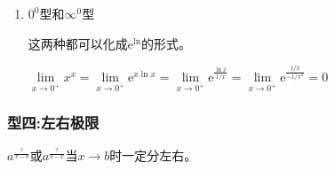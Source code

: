 \begin{enumerate}
            
    

                        
        \begin{example}
            求极限：$\lim\limits_{x \to +\infty}(2x+1)^2 \sin{\frac{1}{x^2}}$。
        \end{example}  
        
        \begin{solution}
            \begin{align*}
                \text{原式}
                &=\lim_{x \to +\infty}\frac{(2x+1)^2}{x^2} \times \frac{\sin{\frac{1}{x^2}}}{\frac{1}{x^2}}=4
            \end{align*}
        \end{solution}

        \begin{example}
            求极限：$\lim\limits_{x \to +\infty}(x-x^2\ln(1+\displaystyle\frac{1}{x}))$。
        \end{example}

        \begin{solution}
            \begin{align*}
                \text{原式}
                &=\lim_{x \to +\infty}x^2(\frac{1}{x}-\ln(1+\frac{1}{x}))\\
                &=\lim_{x \to +\infty}\frac{\frac{1}{x}-\ln(1+\frac{1}{x})}{\frac{1}{x^2}}\\
                &\xlongequal{t=\frac{1}{x}}\lim_{t \to 0}\frac{t-\ln(1+t)}{t^2}\\
                &=\lim_{t \to 0}\frac{1-\frac{1}{t+1}}{2t}\\
                &=\lim_{t \to 0}\frac{\frac{t}{t+1}}{2t}=\frac{1}{2}
            \end{align*}
        \end{solution}

        \item $0^0$型和$\infty ^{0}$型

        这两种都可以化成$\mathrm{e}^{\ln}$的形式。

        \begin{example}
            $\lim\limits_{x \to 0^{+}}x^x=\lim\limits_{x \to 0^{+}}\mathrm{e}^{x \ln x}=\lim\limits_{x \to 0^{+}}\mathrm{e}^{\frac{\ln x}{1/x}}=\lim\limits_{x \to 0^{+}}\mathrm{e}^{\frac{1/x}{-1/x^2}}=0$
        \end{example}
        \end{enumerate}

        \subsubsection*{型四:左右极限}
        \FiveStar $a^{\displaystyle\frac{?}{x-b}}$或$a^{\displaystyle\frac{?}{b-x}}$当$x \to b$时一定分左右。

